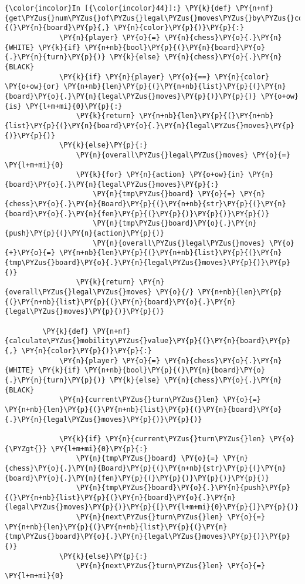     \begin{Verbatim}[commandchars=\\\{\}]
{\color{incolor}In [{\color{incolor}44}]:} \PY{k}{def} \PY{n+nf}{get\PYZus{}num\PYZus{}of\PYZus{}legal\PYZus{}moves\PYZus{}by\PYZus{}color}\PY{p}{(}\PY{n}{board}\PY{p}{,} \PY{n}{color}\PY{p}{)}\PY{p}{:}
             \PY{n}{player} \PY{o}{=} \PY{n}{chess}\PY{o}{.}\PY{n}{WHITE} \PY{k}{if} \PY{n+nb}{bool}\PY{p}{(}\PY{n}{board}\PY{o}{.}\PY{n}{turn}\PY{p}{)} \PY{k}{else} \PY{n}{chess}\PY{o}{.}\PY{n}{BLACK}
             \PY{k}{if} \PY{n}{player} \PY{o}{==} \PY{n}{color} \PY{o+ow}{or} \PY{n+nb}{len}\PY{p}{(}\PY{n+nb}{list}\PY{p}{(}\PY{n}{board}\PY{o}{.}\PY{n}{legal\PYZus{}moves}\PY{p}{)}\PY{p}{)} \PY{o+ow}{is} \PY{l+m+mi}{0}\PY{p}{:}
                 \PY{k}{return} \PY{n+nb}{len}\PY{p}{(}\PY{n+nb}{list}\PY{p}{(}\PY{n}{board}\PY{o}{.}\PY{n}{legal\PYZus{}moves}\PY{p}{)}\PY{p}{)}
             \PY{k}{else}\PY{p}{:}
                 \PY{n}{overall\PYZus{}legal\PYZus{}moves} \PY{o}{=} \PY{l+m+mi}{0}
                 \PY{k}{for} \PY{n}{action} \PY{o+ow}{in} \PY{n}{board}\PY{o}{.}\PY{n}{legal\PYZus{}moves}\PY{p}{:}
                     \PY{n}{tmp\PYZus{}board} \PY{o}{=} \PY{n}{chess}\PY{o}{.}\PY{n}{Board}\PY{p}{(}\PY{n+nb}{str}\PY{p}{(}\PY{n}{board}\PY{o}{.}\PY{n}{fen}\PY{p}{(}\PY{p}{)}\PY{p}{)}\PY{p}{)}
                     \PY{n}{tmp\PYZus{}board}\PY{o}{.}\PY{n}{push}\PY{p}{(}\PY{n}{action}\PY{p}{)}
                     \PY{n}{overall\PYZus{}legal\PYZus{}moves} \PY{o}{+}\PY{o}{=} \PY{n+nb}{len}\PY{p}{(}\PY{n+nb}{list}\PY{p}{(}\PY{n}{tmp\PYZus{}board}\PY{o}{.}\PY{n}{legal\PYZus{}moves}\PY{p}{)}\PY{p}{)}
                 \PY{k}{return} \PY{n}{overall\PYZus{}legal\PYZus{}moves} \PY{o}{/} \PY{n+nb}{len}\PY{p}{(}\PY{n+nb}{list}\PY{p}{(}\PY{n}{board}\PY{o}{.}\PY{n}{legal\PYZus{}moves}\PY{p}{)}\PY{p}{)}
             
         \PY{k}{def} \PY{n+nf}{calculate\PYZus{}mobility\PYZus{}value}\PY{p}{(}\PY{n}{board}\PY{p}{,} \PY{n}{color}\PY{p}{)}\PY{p}{:}
             \PY{n}{player} \PY{o}{=} \PY{n}{chess}\PY{o}{.}\PY{n}{WHITE} \PY{k}{if} \PY{n+nb}{bool}\PY{p}{(}\PY{n}{board}\PY{o}{.}\PY{n}{turn}\PY{p}{)} \PY{k}{else} \PY{n}{chess}\PY{o}{.}\PY{n}{BLACK}
             \PY{n}{current\PYZus{}turn\PYZus{}len} \PY{o}{=} \PY{n+nb}{len}\PY{p}{(}\PY{n+nb}{list}\PY{p}{(}\PY{n}{board}\PY{o}{.}\PY{n}{legal\PYZus{}moves}\PY{p}{)}\PY{p}{)}
         
             \PY{k}{if} \PY{n}{current\PYZus{}turn\PYZus{}len} \PY{o}{\PYZgt{}} \PY{l+m+mi}{0}\PY{p}{:}
                 \PY{n}{tmp\PYZus{}board} \PY{o}{=} \PY{n}{chess}\PY{o}{.}\PY{n}{Board}\PY{p}{(}\PY{n+nb}{str}\PY{p}{(}\PY{n}{board}\PY{o}{.}\PY{n}{fen}\PY{p}{(}\PY{p}{)}\PY{p}{)}\PY{p}{)}
                 \PY{n}{tmp\PYZus{}board}\PY{o}{.}\PY{n}{push}\PY{p}{(}\PY{n+nb}{list}\PY{p}{(}\PY{n}{board}\PY{o}{.}\PY{n}{legal\PYZus{}moves}\PY{p}{)}\PY{p}{[}\PY{l+m+mi}{0}\PY{p}{]}\PY{p}{)}
                 \PY{n}{next\PYZus{}turn\PYZus{}len} \PY{o}{=} \PY{n+nb}{len}\PY{p}{(}\PY{n+nb}{list}\PY{p}{(}\PY{n}{tmp\PYZus{}board}\PY{o}{.}\PY{n}{legal\PYZus{}moves}\PY{p}{)}\PY{p}{)}
             \PY{k}{else}\PY{p}{:}
                 \PY{n}{next\PYZus{}turn\PYZus{}len} \PY{o}{=} \PY{l+m+mi}{0}
             

\end{Verbatim}
